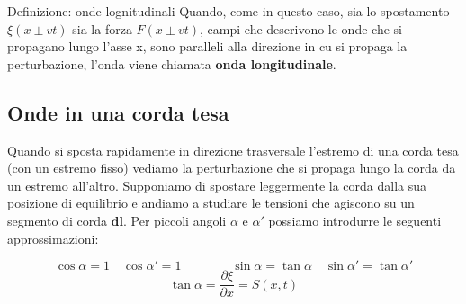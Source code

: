 \documentclass[x11names]{report}
\begin{document}
	
	\begin{center}
		\colorbox{yblue}{\begin{minipage}{5.75in}
				\begin{blues}{Definizione: onde lognitudinali}
					Quando, come in questo caso, sia lo spostamento \(\xi(x\pm vt)\) sia la forza \(F(x\pm vt)\), campi che descrivono le onde che si propagano lungo l'asse x, sono paralleli alla direzione in cu si propaga la perturbazione, l'onda viene chiamata \textbf{onda longitudinale}.
				\end{blues}
		\end{minipage}}
	\end{center}
	
	\newpage
	\subsection{Onde in una corda tesa}
	Quando si sposta rapidamente in direzione trasversale l'estremo di una corda tesa (con un estremo fisso) vediamo la perturbazione che si propaga lungo la corda da un estremo all'altro. Supponiamo di spostare leggermente la corda dalla sua posizione di equilibrio e andiamo a studiare le tensioni che agiscono su un segmento di corda \(\mathbf{dl}\). Per piccoli angoli \(\alpha\) e \(\alpha'\) possiamo introdurre le seguenti approssimazioni:
	
	\[ 
	\cos{\alpha} = 1 \quad \cos{\alpha'} = 1 \qquad \qquad \sin{\alpha} = \tan{\alpha} \quad \sin{\alpha'} = \tan{\alpha'}
	\]
	\[ 
	\boxed{\tan\alpha = \frac{\partial \xi}{\partial x} = S(x,t)}
	\]
	
\end{document}
